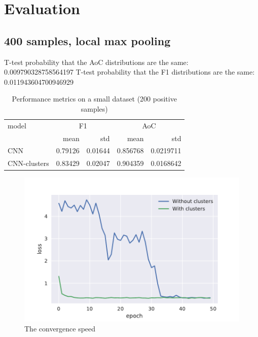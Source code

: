 \section{Evaluation}
\FloatBarrier

\subsection{400 samples, local max pooling}
T-test probability that the AoC distributions are the same: 0.009790328758564197
T-test probability that the F1 distributions are the same: 0.011943604700946929
\begin{table}[htb]
  \centering
  \begin{tabular}{lrrrr}
    \toprule
    model & \multicolumn{2}{c}{F1} & \multicolumn{2}{c}{AoC} \\
    \cmidrule(l){2-3} \cmidrule(l){4-5}
    & mean & std & mean & std \\
    \midrule
    CNN & 0.79126 & 0.01644 & 0.856768 & 0.0219711 \\
    CNN-clusters & 0.83429 & 0.02047 & 0.904359 & 0.0168642 \\
    \bottomrule
  \end{tabular}
  \caption{Performance metrics on a small dataset (200 positive
    samples)}
  \label{tbl:small}
\end{table}

\begin{figure}[htb]
  \centering
  \includegraphics[width=\textwidth]{figures/results/small_5_fold_convergence.pdf}
  \caption{The convergence speed}
  \label{fig:small_convergence}
\end{figure}

